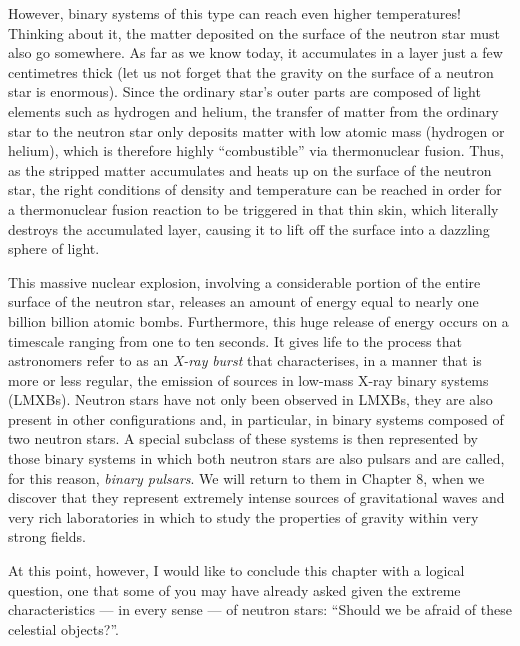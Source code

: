However, binary systems of this type can reach even higher temperatures! Thinking about
it, the matter deposited on the surface of the neutron star must also go somewhere. As
far as we know today, it accumulates in a layer just a few centimetres thick (let us not
forget that the gravity on the surface of a neutron star is enormous). Since the
ordinary star's outer parts are composed of light elements such as hydrogen and helium,
the transfer of matter from the ordinary star to the neutron star only deposits matter
with low atomic mass (hydrogen or helium), which is therefore highly ``combustible'' via
thermonuclear fusion. Thus, as the stripped matter accumulates and
heats up on the surface of the neutron star, the right conditions of density and
temperature can be reached in order for a thermonuclear fusion reaction to be triggered
in that thin skin, which literally destroys the accumulated layer, causing it to lift
off the surface into a dazzling sphere of light.

This massive nuclear explosion, involving a considerable portion of the entire surface
of the neutron star, releases an amount of energy equal to nearly one
billion billion atomic bombs. Furthermore, this huge release of energy occurs on a
timescale ranging from one to ten seconds. It gives life to the process that astronomers
refer to as an \emph{X-ray} \emph{burst} that characterises, in a
manner that is more or less regular, the emission of sources in low-mass
X-ray binary systems (LMXBs). Neutron stars have not only been
observed in LMXBs, they are also present in other configurations and, in particular, in
binary systems composed of two neutron stars. A special subclass of these systems is
then represented by those binary systems in which both neutron stars are also pulsars
and are called, for this reason, \emph{binary
pulsars}. We will return to them in Chapter 8,
when we discover that they represent extremely intense sources of gravitational waves
and very rich laboratories in which to study the properties of gravity within very
strong fields.

At this point, however, I would like to conclude this chapter with a logical question,
one that some of you may have already asked given the extreme characteristics --- in
every sense --- of neutron stars: ``Should we be afraid of these celestial objects?''.

